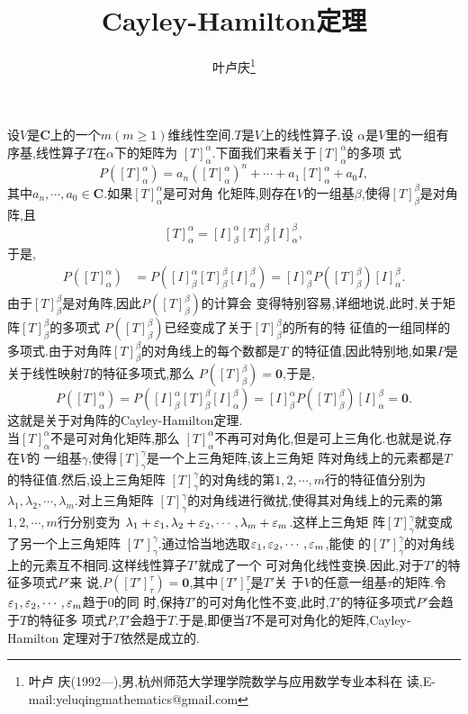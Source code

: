 ﻿\documentclass[a4paper]{article}
\begin{document}
\title{\huge{\bf{Cayley-Hamilton定理}}} \author{\small{叶卢庆\footnote{叶卢
      庆(1992---),男,杭州师范大学理学院数学与应用数学专业本科在
      读,E-mail:yeluqingmathematics@gmail.com}}}
\maketitle\ni
设$V$是$\mathbf{C}$上的一个$m(m\geq 1)$维线性空间.$T$是$V$上的线性算子.设
$\alpha$是$V$里的一组有序基,线性算子$T$在$\alpha$下的矩阵为
$[T]_{\alpha}^{\alpha}$.下面我们来看关于$[T]_{\alpha}^{\alpha}$的多项
式
$$
P([T]_{\alpha}^{\alpha})=a_n([T]_{\alpha}^{\alpha})^n+\cdots+a_1[T]_{\alpha}^{\alpha}+a_0I,
$$
其中$a_n,\cdots,a_0\in \mathbf{C}$.如果$[T]_{\alpha}^{\alpha}$是可对角
化矩阵,则存在$V$的一组基$\beta$,使得$[T]_{\beta}^{\beta}$是对角阵,且
$$
[T]_{\alpha}^{\alpha}=[I]_{\beta}^{\alpha}[T]_{\beta}^{\beta}[I]_{\alpha}^{\beta},
$$
于是,
\begin{align*}
P([T]_{\alpha}^{\alpha})&=P([I]_{\beta}^{\alpha}[T]_{\beta}^{\beta}[I]_{\alpha}^{\beta})=[I]_{\beta}^{\alpha}P([T]_{\beta}^{\beta})[I]_{\alpha}^{\beta}.
\end{align*}
由于$[T]_{\beta}^{\beta}$是对角阵,因此$P([T]_{\beta}^{\beta})$的计算会
变得特别容易,详细地说,此时,关于矩阵$[T]_{\beta}^{\beta}$的多项式
$P([T]_{\beta}^{\beta})$已经变成了关于$[T]_{\beta}^{\beta}$的所有的特
征值的一组同样的多项式.由于对角阵$[T]_{\beta}^{\beta}$的对角线上的每个数都是$T$
的特征值,因此特别地,如果$P$是关于线性映射$T$的特征多项式,那么
$P([T]_{\beta}^{\beta})=\mathbf{0}$,于是,
$$
P([T]_{\alpha}^{\alpha})=P([I]_{\beta}^{\alpha}[T]_{\beta}^{\beta}[I]_{\alpha}^{\beta})=[I]_{\beta}^{\alpha}P([T]_{\beta}^{\beta})[I]_{\alpha}^{\beta}=\mathbf{0}.
$$
这就是关于对角阵的Cayley-Hamilton定理.\\

\ni 当$[T]_{\alpha}^{\alpha}$不是可对角化矩阵,那么
$[T]_{\alpha}^{\alpha}$不再可对角化,但是可上三角化.也就是说,存在$V$的
一组基$\gamma$,使得$[T]_{\gamma}^{\gamma}$是一个上三角矩阵,该上三角矩
阵对角线上的元素都是$T$的特征值.然后,设上三角矩阵
$[T]_{\gamma}^{\gamma}$的对角线的第$1,2,\cdots,m$行的特征值分别为
$\lambda_1,\lambda_2,\cdots,\lambda_m$.对上三角矩阵
$[T]_{\gamma}^{\gamma}$的对角线进行微扰,使得其对角线上的元素的第
$1,2,\cdots,m$行分别变为
$\lambda_1+\varepsilon_1,\lambda_2+\varepsilon_2,\cdots,\lambda_m+\varepsilon_m$.这样上三角矩
阵$[T]_{\gamma}^{\gamma}$就变成了另一个上三角矩阵
$[T']_{\gamma}^{\gamma}$.通过恰当地选取$\varepsilon_1,\varepsilon_2,\cdots,\varepsilon_m$,能使
的$[T']_{\gamma}^{\gamma}$的对角线上的元素互不相同.这样线性算子$T'$就成了一个
可对角化线性变换.因此,对于$T'$的特征多项式$P'$来
说,$P([T']_{\tau}^{\tau})=\mathbf{0}$,其中$[T']_{\tau}^{\tau}$是$T'$关
于$V$的任意一组基$\tau$的矩阵.令$\varepsilon_1,\varepsilon_2,\cdots,\varepsilon_m$趋于$0$的同
时,保持$T'$的可对角化性不变,此时,$T'$的特征多项式$P'$会趋于$T$的特征多
项式$P$,$T'$会趋于$T$.于是,即便当$T$不是可对角化的矩阵,Cayley-Hamilton
定理对于$T$依然是成立的.
\end{document}
